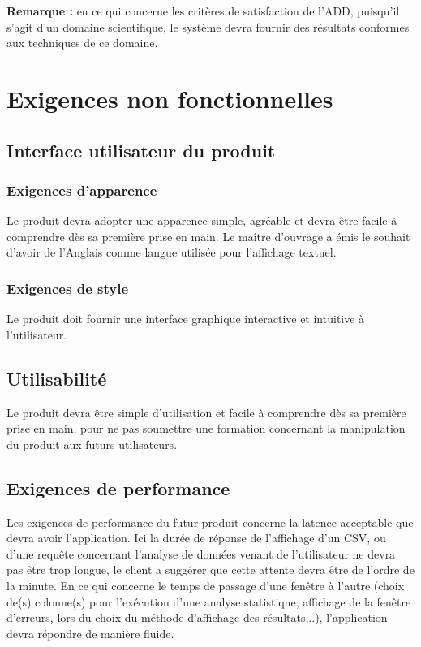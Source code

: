 			\textbf{Remarque :} en ce qui concerne les critères de satisfaction de l'ADD, puisqu'il s'agit d'un domaine scientifique, le système devra fournir des résultats conformes aux techniques de ce domaine.
	
	
	\section{Exigences non fonctionnelles}
		\subsection{Interface utilisateur du produit}
		
			\subsubsection{Exigences d’apparence} 
			Le produit devra adopter une apparence simple, agréable et devra être facile à comprendre dès sa première prise en main.
			Le maître d’ouvrage a émis le souhait d’avoir de l’Anglais comme langue utilisée pour l’affichage textuel.

			\subsubsection{Exigences de style}
			Le produit doit fournir une interface graphique interactive et intuitive à l'utilisateur.

		\subsection{Utilisabilité}
		Le produit devra être simple d’utilisation et facile à comprendre dès sa première prise en main, pour ne pas soumettre une formation concernant la manipulation du produit aux futurs utilisateurs.
		

		\subsection{Exigences de performance} 
		Les exigences de performance du futur produit concerne la latence acceptable que devra avoir l'application. Ici la durée de réponse de l’affichage d’un CSV, ou d’une requête concernant l’analyse de données venant de l’utilisateur ne devra pas être trop longue, le client a suggérer que cette attente devra être de l’ordre de la minute. En ce qui concerne le temps de passage d'une fenêtre à l'autre (choix de(s) colonne(s) pour l'exécution d'une analyse statistique, affichage de la fenêtre d'erreurs, lors du choix du méthode d’affichage des résultats,..), l’application devra répondre de manière fluide. 

